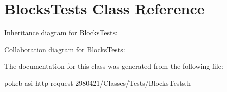 \hypertarget{interface_blocks_tests}{
\section{\-Blocks\-Tests \-Class \-Reference}
\label{interface_blocks_tests}
}


\-Inheritance diagram for \-Blocks\-Tests\-:


\-Collaboration diagram for \-Blocks\-Tests\-:


\-The documentation for this class was generated from the following file\-:\begin{DoxyCompactItemize}
\item 
pokeb-\/asi-\/http-\/request-\/2980421/\-Classes/\-Tests/\-Blocks\-Tests.\-h\end{DoxyCompactItemize}
